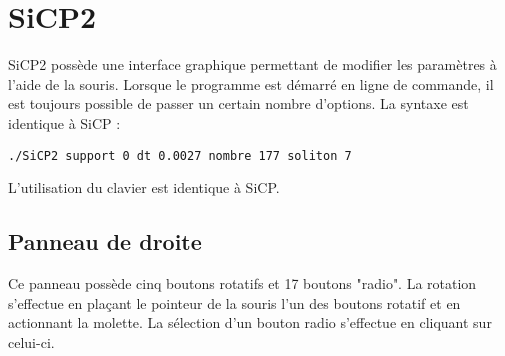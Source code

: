 %
\section{SiCP2}
%
%
SiCP2 possède une interface graphique permettant de modifier les paramètres à l'aide de la souris. Lorsque le programme est démarré en ligne de commande, il est toujours possible de passer un certain nombre d'options. La syntaxe est identique à SiCP :
\begin{center}
\texttt{./SiCP2 support 0 dt 0.0027 nombre 177 soliton 7}
\end{center}
L'utilisation du clavier est identique à SiCP.
%
%
%
\subsection{Panneau de droite}
%
Ce panneau possède cinq boutons rotatifs et 17 boutons "radio". La rotation s'effectue en plaçant le pointeur de la souris l'un des boutons rotatif et en actionnant la molette. La sélection d'un bouton radio s'effectue en cliquant sur celui-ci. 
%
%
